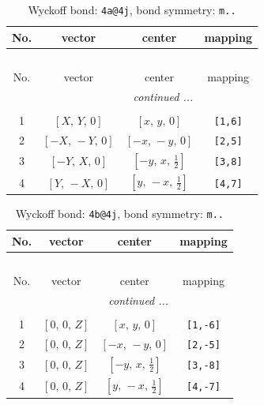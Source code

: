 \documentclass[fleqn,8pt]{jsarticle}
\begin{document}
\begin{longtable}{cccc}
\caption{Wyckoff bond: {\tt 4a@4j}, bond symmetry: {\tt m..}}
 \\
 \hline \hline
No. & vector & center & mapping \\ \hline \endfirsthead

\multicolumn{3}{l}{\tablename\ \thetable{}} \\
 \hline \hline
No. & vector & center & mapping \\ \hline \endhead

 \hline \hline
\multicolumn{3}{r}{\footnotesize\it continued ...} \\ \endfoot

 \hline \hline
\multicolumn{3}{r}{} \\ \endlastfoot

1 & $\left[ X,\, Y,\, 0 \right]$ & $\left[ x,\, y,\, 0 \right]$ & {\tt [1,6]} \\ \hline
2 & $\left[ - X,\, - Y,\, 0 \right]$ & $\left[ - x,\, - y,\, 0 \right]$ & {\tt [2,5]} \\ \hline
3 & $\left[ - Y,\, X,\, 0 \right]$ & $\left[ - y,\, x,\, \frac{1}{2} \right]$ & {\tt [3,8]} \\ \hline
4 & $\left[ Y,\, - X,\, 0 \right]$ & $\left[ y,\, - x,\, \frac{1}{2} \right]$ & {\tt [4,7]} \\
\end{longtable}
\renewcommand{\arraystretch}{1.2}
\begin{longtable}{cccc}
\caption{Wyckoff bond: {\tt 4b@4j}, bond symmetry: {\tt m..}}
 \\
 \hline \hline
No. & vector & center & mapping \\ \hline \endfirsthead

\multicolumn{3}{l}{\tablename\ \thetable{}} \\
 \hline \hline
No. & vector & center & mapping \\ \hline \endhead

 \hline \hline
\multicolumn{3}{r}{\footnotesize\it continued ...} \\ \endfoot

 \hline \hline
\multicolumn{3}{r}{} \\ \endlastfoot

1 & $\left[ 0,\, 0,\, Z \right]$ & $\left[ x,\, y,\, 0 \right]$ & {\tt [1,-6]} \\ \hline
2 & $\left[ 0,\, 0,\, Z \right]$ & $\left[ - x,\, - y,\, 0 \right]$ & {\tt [2,-5]} \\ \hline
3 & $\left[ 0,\, 0,\, Z \right]$ & $\left[ - y,\, x,\, \frac{1}{2} \right]$ & {\tt [3,-8]} \\ \hline
4 & $\left[ 0,\, 0,\, Z \right]$ & $\left[ y,\, - x,\, \frac{1}{2} \right]$ & {\tt [4,-7]} \\
\end{longtable}
\end{document}
